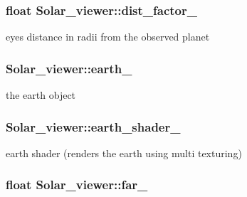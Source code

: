 \subsubsection[{\texorpdfstring{dist\+\_\+factor\+\_\+}{dist_factor_}}]{\setlength{\rightskip}{0pt plus 5cm}float Solar\+\_\+viewer\+::dist\+\_\+factor\+\_\+\hspace{0.3cm}{\ttfamily [private]}}\hypertarget{classSolar__viewer_a7447e4773978c9391a2ab54a52b92b43}{}\label{classSolar__viewer_a7447e4773978c9391a2ab54a52b92b43}


eye\textquotesingle{}s distance in radii from the observed planet 

\subsubsection[{\texorpdfstring{earth\+\_\+}{earth_}}]{ Solar\+\_\+viewer\+::earth\+\_\+\hspace{0.3cm}{\ttfamily [private]}}\hypertarget{classSolar__viewer_a769d9e8775ba2106682964488117e695}{}\label{classSolar__viewer_a769d9e8775ba2106682964488117e695}


the earth object 

\subsubsection[{\texorpdfstring{earth\+\_\+shader\+\_\+}{earth_shader_}}]{ Solar\+\_\+viewer\+::earth\+\_\+shader\+\_\+\hspace{0.3cm}{\ttfamily [private]}}\hypertarget{classSolar__viewer_a5a423c2328fd2d79de95a2a270b385e3}{}\label{classSolar__viewer_a5a423c2328fd2d79de95a2a270b385e3}


earth shader (renders the earth using multi texturing) 

\subsubsection[{\texorpdfstring{far\+\_\+}{far_}}]{\setlength{\rightskip}{0pt plus 5cm}float Solar\+\_\+viewer\+::far\+\_\+\hspace{0.3cm}{\ttfamily [private]}}\hypertarget{classSolar__viewer_ae47e94d8d1b6ee4297454d6234531d87}{}\label{classSolar__viewer_ae47e94d8d1b6ee4297454d6234531d87}



